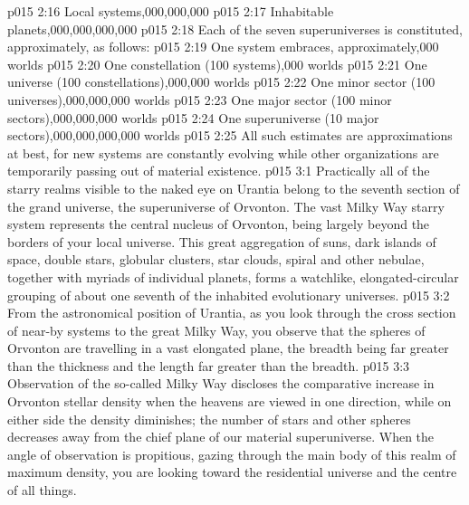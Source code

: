 \vs p015 2:16 Local systems,000,000,000
\vs p015 2:17 Inhabitable planets,000,000,000,000
\vs p015 2:18 Each of the seven superuniverses is constituted, approximately, as follows:
\vs p015 2:19 One system embraces, approximately,000 worlds
\vs p015 2:20 One constellation (100 systems),000 worlds
\vs p015 2:21 One universe (100 constellations),000,000 worlds
\vs p015 2:22 One minor sector (100 universes),000,000,000 worlds
\vs p015 2:23 One major sector (100 minor sectors),000,000,000 worlds
\vs p015 2:24 One superuniverse (10 major sectors),000,000,000,000 worlds
\vs p015 2:25 \pc All such estimates are approximations at best, for new systems are constantly evolving while other organizations are temporarily passing out of material existence.
\vs p015 3:1 Practically all of the starry realms visible to the naked eye on Urantia belong to the seventh section of the grand universe, the superuniverse of Orvonton. The vast Milky Way starry system represents the central nucleus of Orvonton, being largely beyond the borders of your local universe. This great aggregation of suns, dark islands of space, double stars, globular clusters, star clouds, spiral and other nebulae, together with myriads of individual planets, forms a watchlike, elongated\hyp{}circular grouping of about one seventh of the inhabited evolutionary universes.
\vs p015 3:2 From the astronomical position of Urantia, as you look through the cross section of near-by systems to the great Milky Way, you observe that the spheres of Orvonton are travelling in a vast elongated plane, the breadth being far greater than the thickness and the length far greater than the breadth.
\vs p015 3:3 Observation of the so\hyp{}called Milky Way discloses the comparative increase in Orvonton stellar density when the heavens are viewed in one direction, while on either side the density diminishes; the number of stars and other spheres decreases away from the chief plane of our material superuniverse. When the angle of observation is propitious, gazing through the main body of this realm of maximum density, you are looking toward the residential universe and the centre of all things.
